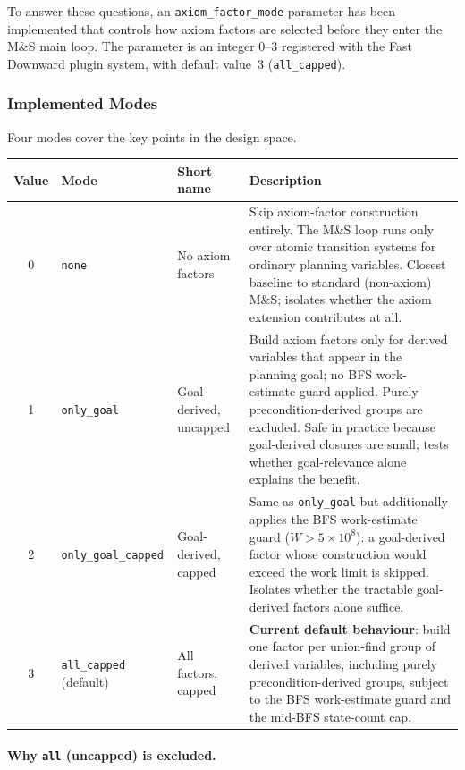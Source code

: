 \documentclass[11pt,a4paper]{article}
\begin{document}
To answer these questions, an \texttt{axiom\_factor\_mode} parameter has been
implemented that controls how axiom factors are selected before they enter the
M\&S main loop.  The parameter is an integer $0$--$3$ registered with the
Fast Downward plugin system, with default value~$3$ (\texttt{all\_capped}).

\subsubsection{Implemented Modes}

Four modes cover the key points in the design space.

\begin{center}
\small
\begin{tabular}{cllp{6.5cm}}
\toprule
\textbf{Value} & \textbf{Mode} & \textbf{Short name} & \textbf{Description} \\
\midrule
0 & \texttt{none}        & No axiom factors
  & Skip axiom-factor construction entirely.  The M\&S loop runs only over
    atomic transition systems for ordinary planning variables.  Closest
    baseline to standard (non-axiom) M\&S; isolates whether the axiom
    extension contributes at all. \\[4pt]
1 & \texttt{only\_goal}  & Goal-derived, uncapped
  & Build axiom factors only for derived variables that appear in the planning
    goal; no BFS work-estimate guard applied.  Purely precondition-derived
    groups are excluded.  Safe in practice because goal-derived closures are
    small; tests whether goal-relevance alone explains the benefit. \\[4pt]
2 & \texttt{only\_goal\_capped} & Goal-derived, capped
  & Same as \texttt{only\_goal} but additionally applies the BFS
    work-estimate guard ($W > 5\times10^8$): a goal-derived factor whose
    construction would exceed the work limit is skipped.  Isolates whether
    the tractable goal-derived factors alone suffice. \\[4pt]
3 & \texttt{all\_capped} (default) & All factors, capped
  & \textbf{Current default behaviour}: build one factor per union-find group
    of derived variables, including purely precondition-derived groups, subject
    to the BFS work-estimate guard and the mid-BFS state-count cap. \\
\bottomrule
\end{tabular}
\end{center}

\paragraph{Why \texttt{all} (uncapped) is excluded.}
\end{document}
